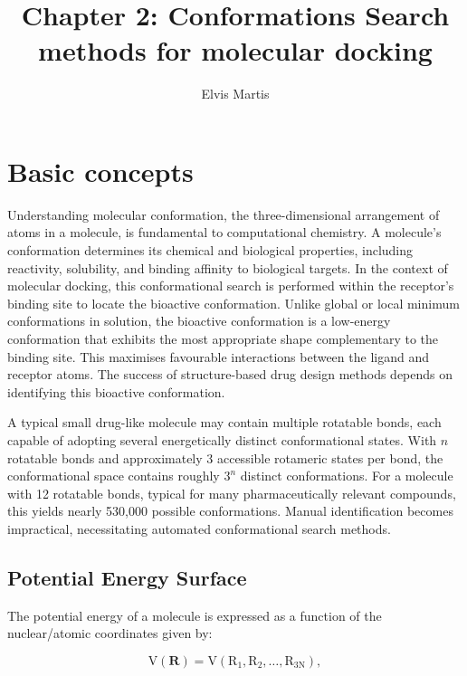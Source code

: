 \documentclass[12pt]{article}
\title{Chapter 2: Conformations Search methods for molecular docking}
\author{Elvis Martis}
\begin{document}
\maketitle


\section{Basic concepts}
Understanding molecular conformation, the three-dimensional arrangement of atoms in a molecule, is fundamental to computational chemistry. A molecule’s conformation determines its chemical and biological properties, including reactivity, solubility, and binding affinity to biological targets. In the context of molecular docking, this conformational search is performed within the receptor's binding site to locate the bioactive conformation. Unlike global or local minimum conformations in solution, the bioactive conformation is a low-energy conformation that exhibits the most appropriate shape complementary to the binding site. This maximises favourable interactions between the ligand and receptor atoms. The success of structure-based drug design methods depends on identifying this bioactive conformation.

A typical small drug-like molecule may contain multiple rotatable bonds, each capable of adopting several energetically distinct conformational states. With $n$ rotatable bonds and approximately 3 accessible rotameric states per bond, the conformational space contains roughly $3^n$ distinct conformations. For a molecule with 12 rotatable bonds, typical for many pharmaceutically relevant compounds, this yields nearly 530,000 possible conformations. Manual identification becomes impractical, necessitating automated conformational search methods.

\subsection{Potential Energy Surface}

The potential energy of a molecule  is expressed as a function of the nuclear/atomic coordinates\cite{CH2_Jensen2017,CH2_Cramer2013} given by:

\begin{equation}
    \textrm{V}(\mathbf{\textrm{R}}) = \textrm{V}(\textrm{R}_1, \textrm{R}_2, \dots, \textrm{R}_{\textrm{{3N}}}),
    \label{eq:PES}
\end{equation}
\end{document}

